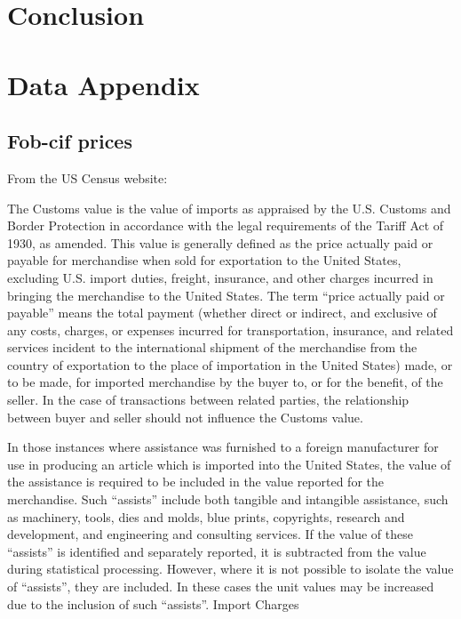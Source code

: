 \documentclass[a4paper,11pt]{article}
\begin{document}
\section{Conclusion}

\newpage




\newpage


\appendix

\section*{Data Appendix \label{app:data}}

\subsection{Fob-cif prices}
From the US Census website:

The Customs value is the value of imports as appraised by the U.S. Customs and Border Protection in accordance with the legal requirements of the Tariff Act of 1930, as amended. This value is generally defined as the price actually paid or payable for merchandise when sold for exportation to the United States, excluding U.S. import duties, freight, insurance, and other charges incurred in bringing the merchandise to the United States. The term ``price actually paid or payable'' means the total payment (whether direct or indirect, and exclusive of any costs, charges, or expenses incurred for transportation, insurance, and related services incident to the international shipment of the merchandise from the country of exportation to the place of importation in the United States) made, or to be made, for imported merchandise by the buyer to, or for the benefit, of the seller. In the case of transactions between related parties, the relationship between buyer and seller should not influence the Customs value.

In those instances where assistance was furnished to a foreign manufacturer for use in producing an article which is imported into the United States, the value of the assistance is required to be included in the value reported for the merchandise. Such ``assists'' include both tangible and intangible assistance, such as machinery, tools, dies and molds, blue prints, copyrights, research and development, and engineering and consulting services. If the value of these ``assists'' is identified and separately reported, it is subtracted from the value during statistical processing. However, where it is not possible to isolate the value of ``assists'', they are included. In these cases the unit values may be increased due to the inclusion of such ``assists''.
Import Charges
\end{document}

